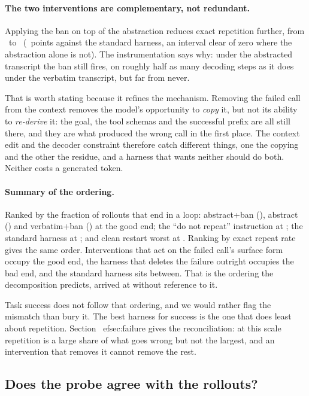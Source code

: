 \paragraph{The two interventions are complementary, not redundant.}
Applying the ban on top of the abstraction reduces exact repetition further,
from \AgentAbstractRepeat\ to \AgentAbsBanRepeat\ (\DeltaAbsBanRepeat\ points
against the standard harness, an interval clear of zero where the abstraction
alone is not). The instrumentation says why: under the abstracted transcript the
ban still fires, on roughly half as many decoding steps as it does under the
verbatim transcript, but far from never.

That is worth stating because it refines the mechanism. Removing the failed
call from the context removes the model's opportunity to \emph{copy} it, but
not its ability to \emph{re-derive} it: the goal, the tool schemas and the
successful prefix are all still there, and they are what produced the wrong call
in the first place. The context edit and the decoder constraint therefore catch different things,
one the copying and the other the residue, and a harness that wants neither
should do both. Neither costs a generated token.

\paragraph{Summary of the ordering.}
Ranked by the fraction of rollouts that end in a loop: abstract+ban
(\AgentAbsBanStuck), abstract (\AgentAbstractStuck) and verbatim+ban
(\AgentVerbBanStuck) at the good end; the ``do not repeat'' instruction at
\AgentInstrStuck; the standard harness at \AgentVerbatimStuck; and clean
restart worst at \AgentDropStuck. Ranking by exact repeat rate gives the same
order. Interventions that act on the failed call's surface form occupy the good
end, the harness that deletes the failure outright occupies the bad end, and the standard harness sits between. That is the ordering the decomposition
predicts, arrived at without reference to it.

Task success does not follow that ordering, and we would rather flag the
mismatch than bury it. The best harness for success is the one that does least
about repetition. Section~
ef{sec:failure} gives the reconciliation: at this
scale repetition is a large share of what goes wrong but not the largest, and an
intervention that removes it cannot remove the rest.

\subsection{Does the probe agree with the rollouts?}

